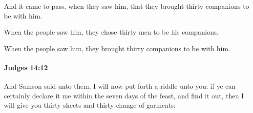 			\begin{versebox}
					\item[BHS] 
					\item[ASV] And it came to pass, when they saw him, that they brought thirty companions to be with him.
					\item[NIV] When the people saw him, they chose thirty men to be his companions.
					\item[NRSV] When the people saw him, they brought thirty companions to be with him.
			\end{versebox}

		\paragraph{Judges 14:12} %
			\label{JUDGES-14-12}

			And Samson said unto them, I will now put forth a riddle unto you: if ye can certainly declare it me within the seven days of the feast, and find it out, then I will give you thirty sheets and thirty change of garments:

